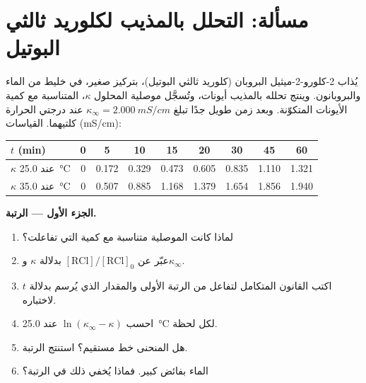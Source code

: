 \section{مسألة: التحلل بالمذيب لكلوريد ثالثي البوتيل}

\begin{problem}
\label{pb:b1:nucleophilic-substitution:1}
يُذاب 2-كلورو-2-ميثيل البروبان (كلوريد ثالثي البوتيل)، بتركيز
صغير، في خليط من الماء والبروبانون. وينتج تحلله بالمذيب
 أيونات، وتُسجَّل
موصلية المحلول $\kappa$، المتناسبة مع
كمية الأيونات المتكوّنة. وبعد زمن طويل جدًا تبلغ
$\kappa_\infty = \qty{2.000}{mS/cm}$ عند درجتي الحرارة كلتيهما. القياسات
(\unit{mS/cm}):

\begin{center}
\begin{tabular}{lcccccccc}
\hline
$t$ (min) & 0 & 5 & 10 & 15 & 20 & 30 & 45 & 60 \\
\hline
$\kappa$ عند \qty{25.0}{\celsius} & 0 & 0.172 & 0.329 & 0.473 & 0.605 & 0.835 & 1.110 & 1.321 \\
$\kappa$ عند \qty{35.0}{\celsius} & 0 & 0.507 & 0.885 & 1.168 & 1.379 & 1.654 & 1.856 & 1.940 \\
\hline
\end{tabular}
\end{center}

\medskip
\noindent\textbf{الجزء الأول --- الرتبة.}
\begin{enumerate}
  \item لماذا كانت الموصلية متناسبة مع كمية 
        التي تفاعلت؟
  \item عبّر عن $[\mathrm{RCl}]/[\mathrm{RCl}]_0$ بدلالة $\kappa$
        و$\kappa_\infty$.
  \item اكتب القانون المتكامل لتفاعل من الرتبة الأولى
        والمقدار الذي يُرسم بدلالة $t$ لاختباره.
  \item احسب $\ln(\kappa_\infty - \kappa)$ عند \qty{25.0}{\celsius} لكل
        لحظة.
  \item هل المنحنى خط مستقيم؟ استنتج الرتبة.
  \item الماء بفائض كبير. فماذا يُخفي ذلك في الرتبة؟
\end{enumerate}


\end{problem}
